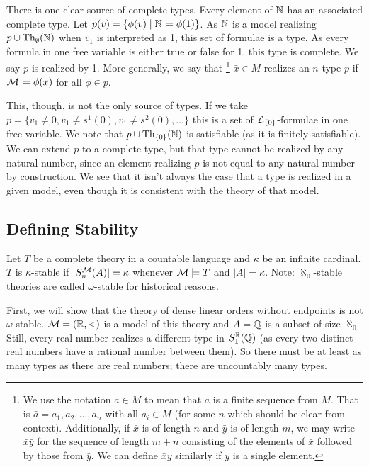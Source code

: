 There is one clear source of complete types. 
Every element of \(\mathbb{N}\) has an associated complete type. 
Let \(p(v) = \{\phi(v) \mid \mathbb{N} \models \phi(1)\}\). 
As \(\mathbb{N}\) is a model realizing \(p \cup \text{Th}_\emptyset(\mathbb{N})\) when \(v_1\) is interpreted as 1, this set of formulae is a type. 
As every formula in one free variable is either true or false for 1, this type is complete. 
We say \(p\) is realized by 1. 
More generally, we say that
\footnote{We use the notation \(\bar{a} \in M\) to mean that \(\bar{a}\) is a finite sequence from \(M\). That is \(\bar{a} = a_1, a_2, \ldots, a_n\) with all \(a_i \in M\) (for some \(n\) which should be clear from context). Additionally, if \(\bar{x}\) is of length \(n\) and \(\bar{y}\) is of length \(m\), we may write \(\bar{x}\bar{y}\) for the sequence of length \(m+n\) consisting of the elements of \(\bar{x}\) followed by those from \(\bar{y}\). We can define \(\bar{x}y\) similarly if \(y\) is a single element.}
 \(\bar{x} \in M\) realizes an \(n\)-type \(p\) if \(\mathcal{M} \models \phi(\bar{x})\) for all \(\phi \in p\).  

This, though, is not the only source of types. 
If we take \(p = \{v_1 \neq 0, v_1 \neq s^1(0), v_1 \neq s^2(0), \ldots\}\) this is a set of \(\mathcal{L}_{\{0\}}\)-formulae in one free variable. 
We note that \(p \cup \text{Th}_{\{0\}}(\mathbb{N})\) is satisfiable (as it is finitely satisfiable). 
We can extend \(p\) to a complete type, but that type cannot be realized by any natural number, since an element realizing \(p\) is not equal to any natural number by construction. 
We see that it isn't always the case that a type is realized in a given model, even though it is consistent with the theory of that model. 

\subsection{Defining Stability}

\begin{definition}\label{def_stability}
Let \(T\) be a complete theory in a countable language and \(\kappa\) be an infinite cardinal. 
\(T\) is \(\kappa\)-stable if \(|S_n^{\mathcal{M}}(A)| = \kappa\) whenever \(\mathcal{M} \models T\) and \(|A| = \kappa\). 
Note: \(\aleph_0\)-stable theories are called \(\omega\)-stable for historical reasons. 
\end{definition}

First, we will show that the theory of dense linear orders without endpoints is not \(\omega\)-stable. 
\(\mathcal{M} = (\mathbb{R}, <)\) is a model of this theory and \(A = \mathbb{Q}\) is a subset of size \(\aleph_0\). 
Still, every real number realizes a different type in \(S_1^{\mathbb{R}}(\mathbb{Q})\) (as every two distinct real numbers have a rational number between them). 
So there must be at least as many types as there are real numbers; there are uncountably many types.  

